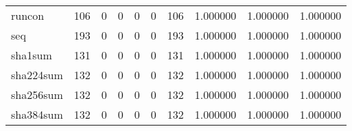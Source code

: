 \begin{longtable}{lrrrrrrrrr}
runcon    &                                                106 &                                                  0 &                                                  0 &                                                  0 &                                                  0 &                                                106 &                                           1.000000 &                               1.000000 &                             1.000000 \\
seq       &                                                193 &                                                  0 &                                                  0 &                                                  0 &                                                  0 &                                                193 &                                           1.000000 &                               1.000000 &                             1.000000 \\
sha1sum   &                                                131 &                                                  0 &                                                  0 &                                                  0 &                                                  0 &                                                131 &                                           1.000000 &                               1.000000 &                             1.000000 \\
sha224sum &                                                132 &                                                  0 &                                                  0 &                                                  0 &                                                  0 &                                                132 &                                           1.000000 &                               1.000000 &                             1.000000 \\
sha256sum &                                                132 &                                                  0 &                                                  0 &                                                  0 &                                                  0 &                                                132 &                                           1.000000 &                               1.000000 &                             1.000000 \\
sha384sum &                                                132 &                                                  0 &                                                  0 &                                                  0 &                                                  0 &                                                132 &                                           1.000000 &                               1.000000 &                             1.000000 \\

\end{longtable}
